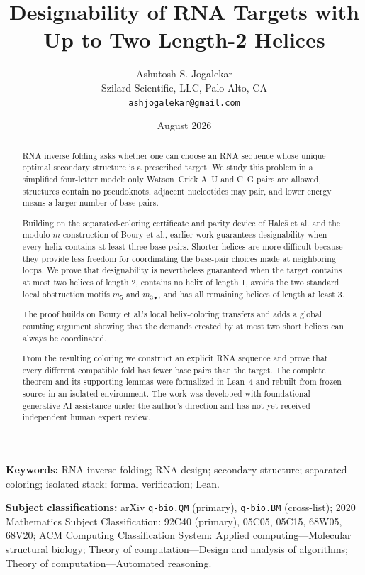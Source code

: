 \documentclass[11pt]{article}
\title{\textbf{Designability of RNA Targets with Up to Two Length-2 Helices}}
\author{Ashutosh S. Jogalekar\\
\small Szilard Scientific, LLC, Palo Alto, CA\\
\small \texttt{ashjogalekar@gmail.com}}
\date{August 2026}
\begin{document}
\maketitle

\begin{abstract}
RNA inverse folding asks whether one can choose an RNA sequence whose unique optimal secondary structure is a prescribed target.  We study this problem in a simplified four-letter model: only Watson--Crick A--U and C--G pairs are allowed, structures contain no pseudoknots, adjacent nucleotides may pair, and lower energy means a larger number of base pairs.

Building on the separated-coloring certificate and parity device of Hale\v{s} et al. and the modulo-$m$ construction of Boury et al., earlier work guarantees designability when every helix contains at least three base pairs.  Shorter helices are more difficult because they provide less freedom for coordinating the base-pair choices made at neighboring loops.  We prove that designability is nevertheless guaranteed when the target contains at most two helices of length 2, contains no helix of length 1, avoids the two standard local obstruction motifs $m_5$ and $m_{3\bullet}$, and has all remaining helices of length at least 3.

The proof builds on Boury et al.'s local helix-coloring transfers and adds a global counting argument showing that the demands created by at most two short helices can always be coordinated.

From the resulting coloring we construct an explicit RNA sequence and prove that every different compatible fold has fewer base pairs than the target.  The complete theorem and its supporting lemmas were formalized in Lean~4 and rebuilt from frozen source in an isolated environment.  The work was developed with foundational generative-AI assistance under the author's direction and has not yet received independent human expert review.
\end{abstract}

\noindent\textbf{Keywords:} RNA inverse folding; RNA design; secondary structure; separated coloring; isolated stack; formal verification; Lean.

\noindent\textbf{Subject classifications:} arXiv \texttt{q-bio.QM} (primary), \texttt{q-bio.BM} (cross-list); 2020 Mathematics Subject Classification: 92C40 (primary), 05C05, 05C15, 68W05, 68V20; ACM Computing Classification System: Applied computing---Molecular structural biology; Theory of computation---Design and analysis of algorithms; Theory of computation---Automated reasoning.
\end{document}
